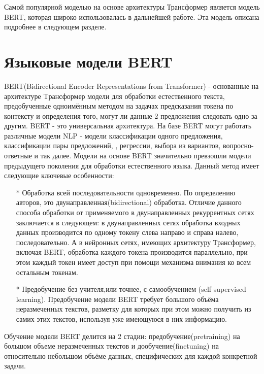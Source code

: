 Самой популярной моделью на основе архитектуры Трансформер является модель BERT, которая широко использовалась в дальнейшей работе. Эта модель описана подробнее в следующем разделе. 

\section{Языковые модели BERT}

BERT(Bidirectional Encoder Representations from Transformer) \cite{Devlin_Chang_Lee_Toutanova_2019} - основанные на архитектуре Tрансформер модели для обработки естественного текста, предобученные одноимённым методом на задачах предсказания токена по контексту и определения того, могут ли данные 2 предложения следовать одно за другим. BERT - это универсальная архитектура. На базе BERT могут работать различные модели NLP - модели классификации одного предложения, классификации пары предложений, , регрессии, выбора из вариантов, вопросно-ответные и так далее. Модели на основе BERT значительно превзошли модели предыдущего поколения для обработки естественного языка. 
Данный метод имеет следующие ключевые особенности:
\begin{itemize}
\item[*] Обработка всей последовательности одновременно. По определению авторов, это двунаправленная(bidirectional) обработка. Отличие данного способа обработки от применяемого в двунаправленных рекуррентных сетях заключается в следующем: в двунаправленных сетях обработка входных данных производится по одному токену слева направо и справа налево, последовательно. А в нейронных сетях, имеющих архитектуру Трансформер, включая BERT, обработка каждого токена производится параллельно, при этом каждый токен имеет доступ при помощи механизма внимания ко всем остальным токенам. 
\item[*] Предобучение без учителя,или точнее, с самообучением (self supervised learning). Предобучение модели BERT требует большого объёма неразмеченных текстов, разметку для которых при этом можно получить из самих этих текстов, используя уже имеющуюся в них информацию.
\end{itemize}
Обучение модели BERT делится на 2 стадии: предобучение(pretraining) на большом объеме неразмеченных текстов и дообучение(finetuning) на относительно небольшом объёме данных, специфических для каждой конкретной задачи. 

